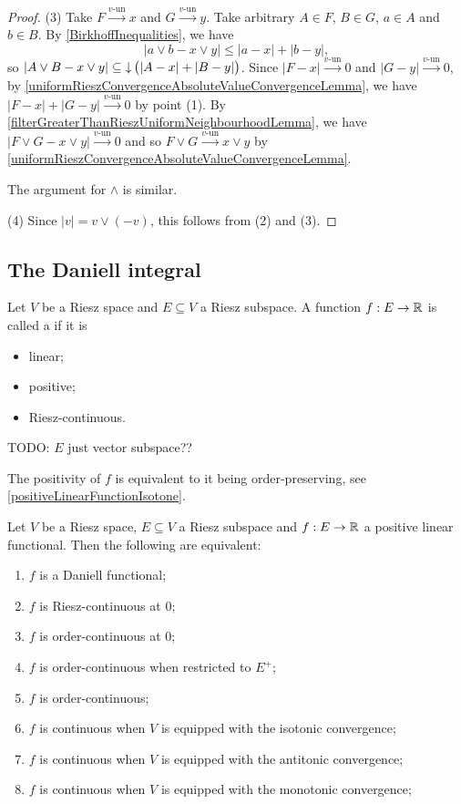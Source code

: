 \begin{proof}
(3) Take $F\overset{\text{$v$-un}}{\longrightarrow} x$ and $G\overset{\text{$v$-un}}{\longrightarrow} y$. Take arbitrary $A\in F$, $B\in G$, $a\in A$ and $b\in B$. By \ref{BirkhoffInequalities}, we have
\[ |a\vee b - x\vee y| \leq |a-x| + |b-y|, \]
so $|A\vee B - x\vee y| \subseteq \operatorname{\downarrow} \big(|A-x| + |B-y|\big)$. Since $|F-x| \overset{\text{$v$-un}}{\longrightarrow} 0$ and $|G - y| \overset{\text{$v$-un}}{\longrightarrow} 0$, by \ref{uniformRieszConvergenceAbsoluteValueConvergenceLemma}, we have $|F-x| + |G-y|\overset{\text{$v$-un}}{\longrightarrow} 0$ by point (1). By \ref{filterGreaterThanRieszUniformNeighbourhoodLemma}, we have $|F\vee G - x\vee y| \overset{\text{$v$-un}}{\longrightarrow} 0$ and so $F\vee G \overset{\text{$v$-un}}{\longrightarrow} x\vee y$ by \ref{uniformRieszConvergenceAbsoluteValueConvergenceLemma}.

The argument for $\wedge$ is similar.

(4) Since $|v| = v\vee (-v)$, this follows from (2) and (3).
\end{proof}

\subsection{The Daniell integral}
\begin{definition}
Let $V$ be a Riesz space and $E\subseteq V$ a Riesz subspace. A function $f: E\to \mathbb{R}$ is called a  if it is
\begin{itemize}
\item linear;
\item positive;
\item Riesz-continuous.
\end{itemize}
\end{definition}
TODO: $E$ just vector subspace??

The positivity of $f$ is equivalent to it being order-preserving, see \ref{positiveLinearFunctionIsotone}.

\begin{lemma}
Let $V$ be a Riesz space, $E\subseteq V$ a Riesz subspace and $f: E\to \mathbb{R}$ a positive linear functional. Then the following are equivalent:
\begin{enumerate}
\item $f$ is a Daniell functional;
\item $f$ is Riesz-continuous at $0$;
\item $f$ is order-continuous at $0$;
\item $f$ is order-continuous when restricted to $E^+$;
\item $f$ is order-continuous;
\item $f$ is continuous when $V$ is equipped with the isotonic convergence;
\item $f$ is continuous when $V$ is equipped with the antitonic convergence;
\item $f$ is continuous when $V$ is equipped with the monotonic convergence;
\end{enumerate}
\end{lemma}


